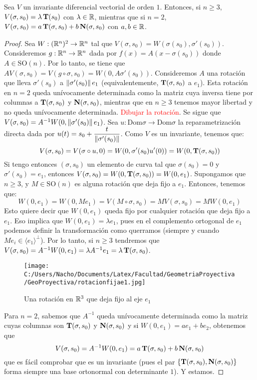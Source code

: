 \begin{prop}
Sea $V$ un invariante diferencial vectorial de orden $1$. Entonces, si $n\geq 3$, $V(\sigma,s_0) = \lambda\operatorname{\mathbf{T}}(s_0)$ con $\lambda\in\mathbb{R}$, mientras que si $n=2$, $V(\sigma,s_0)=a\operatorname{\mathbf{T}}(\sigma,s_0)+b\operatorname{\mathbf{N}}(\sigma,s_0)$ con $a,b\in\mathbb{R}$.
\begin{proof}
Sea $W:(\mathbb{R}^n)^2\to\mathbb{R}^n$ tal que $V(\sigma,s_0)=W(\sigma(s_0),\sigma'(s_0))$. Consideremos $g:\mathbb{R}^n\to\mathbb{R}^n$ dada por $f(x)=A(x-\sigma(s_0))$ donde $A\in\mathrm{SO}(n)$. Por lo tanto, se tiene que $AV(\sigma,s_0)=V(g\circ\sigma,s_0) =W(0,A\sigma'(s_0))$. Consideremos $A$ una rotación que lleva $\sigma'(s_0)$ a $\left\| \sigma'(s_0) \right\|e_1$ (equivalentemente, $\operatorname{\mathbf{T}}(\sigma,s_0)$ a $e_1$). Esta rotación en $n=2$ queda unívocamente determinada como la matriz cuya inversa tiene por columnas a $\operatorname{\mathbf{T}}(\sigma,s_0)$ y $\operatorname{\mathbf{N}}(\sigma,s_0)$, mientras que en $n\geq 3$ tenemos mayor libertad y no queda unívocamente determinada. \textcolor{red}{Dibujar la rotación}. Se sigue que $V(\sigma,s_0) = A^{-1}W(0,\left\| \sigma'(s_0) \right\|e_1)$. Sea $u:\mathrm{Dom}\sigma\to\mathrm{Dom}\sigma$ la reparametrización directa dada por $u(t)=s_0+\dfrac{t}{\left\| \sigma'(s_0) \right\|}$. Como $V$ es un invariante, tenemos que: $$V(\sigma,s_0)=V(\sigma\circ u,0)=W(0,\sigma'(s_0)u'(0)) = W(0,\operatorname{\mathbf{T}}(\sigma,s_0))$$ Si tengo entonces $(\sigma,s_0)$ un elemento de curva tal que $\sigma(s_0)=0$ y $\sigma'(s_0)=e_1$, entonces $V(\sigma,s_0)=W(0,\operatorname{\mathbf{T}}(\sigma,s_0)) = W(0,e_1)$. Supongamos que $n\geq 3$, y $M\in\mathrm{SO}(n)$ es alguna rotación que deja fijo a $e_1$. Entonces, tenemos que: $$W(0,e_1)=W(0,Me_1)=V(M\circ\sigma,s_0)=MV(\sigma,s_0)=MW(0,e_1)$$ Esto quiere decir que $W(0,e_1)$ queda fijo por cualquier rotación que deja fijo a $e_1$. Eso implica que $W(0,e_1)=\lambda e_1$, pues en el complemento ortogonal de $e_1$ podemos definir la transformación como querramos (siempre y cuando $Me_i\in\langle e_1\rangle^{\perp}$). Por lo tanto, si $n\geq 3$ tendremos que $V(\sigma,s_0)=A^{-1}W(0,e_1)=\lambda A^{-1}e_1 = \lambda \operatorname{\mathbf{T}}(\sigma,s_0)$. \begin{figure}[h]
	\centering
		\texttt{[image: C:/Users/Nacho/Documents/Latex/Facultad/GeometriaProyectiva/GeoProyectiva/rotacionfijae1.jpg]}
	\caption{Una rotación en $\mathbb{R}^3$ que deja fijo al eje $e_1$}
	\label{fig:rotacionfijae1}
\end{figure}

Para $n=2$, sabemos que $A^{-1}$ queda unívocamente determinada como la matriz cuyas columnas son $\operatorname{\mathbf{T}}(\sigma,s_0)$ y $\operatorname{\mathbf{N}}(\sigma,s_0)$ y si $W(0,e_1)=ae_1 + be_2$, obtenemos que $$V(\sigma,s_0)=A^{-1}W(0,e_1) = a\operatorname{\mathbf{T}}(\sigma,s_0)+b\operatorname{\mathbf{N}}(\sigma,s_0)$$ que es fácil comprobar que es un invariante (pues el par $\{\operatorname{\mathbf{T}}(\sigma,s_0),\operatorname{\mathbf{N}}(\sigma,s_0)\}$ forma siempre una base ortonormal con determinante $1$). Y estamos.
\end{proof}
\end{prop}

